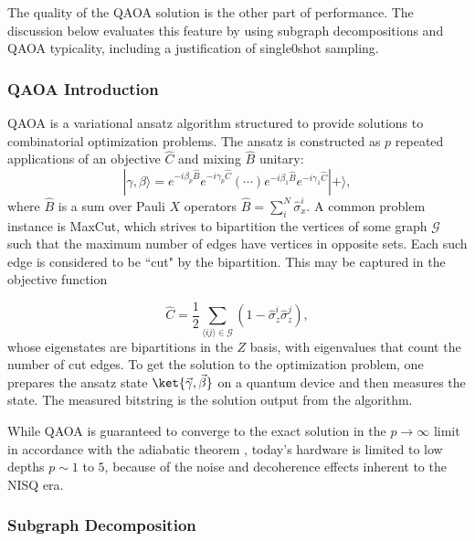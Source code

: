 The quality of the QAOA solution is the other part of performance. The discussion below evaluates this feature by using subgraph decompositions and QAOA typicality, including a justification of single0shot sampling.


\subsubsection{QAOA Introduction}
\label{sec:QAOA_intro}

 QAOA is a variational ansatz algorithm structured to provide solutions to combinatorial optimization problems. The ansatz is constructed as $p$ repeated applications of an objective $\hat C$ and mixing $\hat B$ unitary:
\begin{equation}\label{eq:QAOA_ansatz}
|\gamma,\beta\rangle = e^{-i\beta_p \hat B}e^{-i\gamma_p \hat C}(\cdots)e^{-i\beta_1 \hat B}e^{-i\gamma_1 \hat C}|+\rangle ,
\end{equation}
where $\hat B$ is a sum over Pauli $X$ operators $\hat B = \sum_i^N\hat \sigma_x^i$. A common problem instance is MaxCut, which strives to bipartition the vertices of some graph $\mathcal G$ such that the maximum number of edges have vertices in opposite sets. Each such edge is considered to be ``cut" by the bipartition. This may be captured in the objective function

\begin{equation}
\hat C = \frac{1}{2}\sum_{\langle ij\rangle \in \mathcal G}(1 - {\hat \sigma}_z^i {\hat \sigma}_z^j),
\label{eq:maxcut_cost}
\end{equation}
\newcommand{\gb}{{\vec{\gamma}, \vec{\beta}}}
\newcommand{\Z}{{\hat\sigma_z}}
whose eigenstates are bipartitions in the $Z$ basis, with eigenvalues that count the number of cut edges.
To get the solution to the optimization problem, one prepares the ansatz state $\ket \gb$ on a quantum device and then measures the state. The measured bitstring is the solution output from the algorithm.

While  QAOA is guaranteed to converge to the exact solution in the $p\to\infty$ limit in accordance with the adiabatic theorem \cite{farhi2014quantum,wurtz2021counterdiabaticity}, today's hardware is limited to low depths $p\sim 1$ to $5$, because of the noise and decoherence effects inherent to the NISQ era. 


\subsubsection{Subgraph Decomposition}

